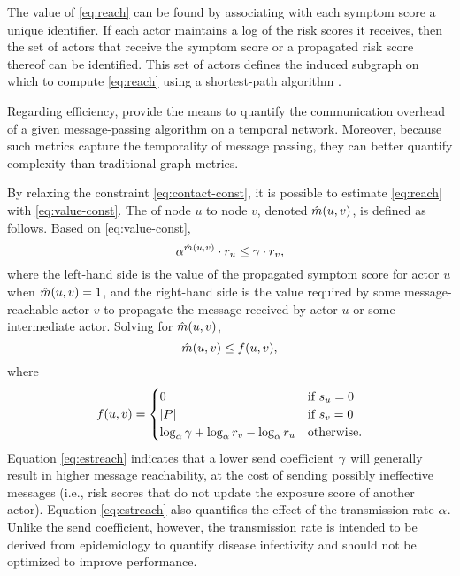 The value of \eqref{eq:reach} can be found by associating with each symptom score a unique identifier. If each actor maintains a log of the risk scores it receives, then the set of actors that receive the symptom score or a propagated risk score thereof can be identified. This set of actors defines the induced subgraph on which to compute \eqref{eq:reach} using a shortest-path algorithm \cite{Johnson1977}. 

Regarding efficiency,  provide the means to quantify the communication overhead of a given message-passing algorithm on a temporal network. Moreover, because such metrics capture the temporality of message passing, they can better quantify complexity than traditional graph metrics.

By relaxing the constraint \eqref{eq:contact-const}, it is possible to estimate \eqref{eq:reach} with \eqref{eq:value-const}. The  of node $u$ to node $v$, denoted $\hat{m}(u, v)$, is defined as follows. Based on \eqref{eq:value-const},
%
\begin{equation*}
    \alpha^{\hat{m}(u, v)} \cdot r_u \leq \gamma \cdot r_v,
\end{equation*}
%
where the left-hand side is the value of the propagated symptom score for actor $u$ when $\hat{m}(u, v) = 1$, and the right-hand side is the value required by some message-reachable actor $v$ to propagate the message received by actor $u$ or some intermediate actor. Solving for $\hat{m}(u, v)$,
%
\begin{equation}\label{eq:estreach}
    \hat{m}(u, v) \leq f(u, v),
\end{equation}
%
where
%
\begin{equation*}
    f(u, v) = 
    \begin{cases} 
        0 & \text{if $s_u = 0$} \\
        \left\vert P \right\vert & \text{if $s_v = 0$} \\
        \log_{\alpha}\gamma + \log_{\alpha}r_v - \log_{\alpha}r_u & \text{otherwise.}
    \end{cases}
\end{equation*}
%
Equation \eqref{eq:estreach} indicates that a lower send coefficient $\gamma$ will generally result in higher message reachability, at the cost of sending possibly ineffective messages (i.e., risk scores that do not update the exposure score of another actor). Equation \eqref{eq:estreach} also quantifies the effect of the transmission rate $\alpha$. Unlike the send coefficient, however, the transmission rate is intended to be derived from epidemiology to quantify disease infectivity and should not be optimized to improve performance.


